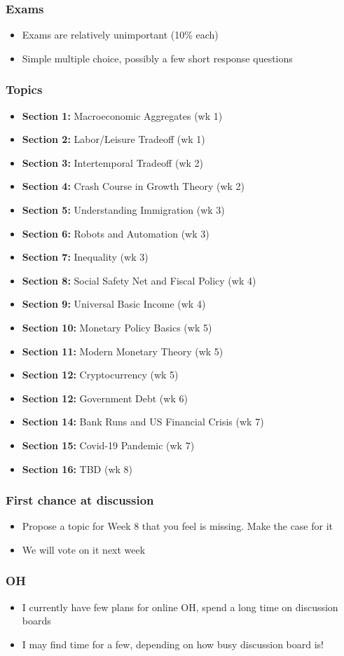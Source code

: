 \documentclass{beamer}
\begin{document}
\begin{frame}
\frametitle{Exams}
\begin{itemize}
\item Exams are relatively unimportant (10\% each)
\bigskip
\item Simple multiple choice, possibly a few short response questions
\end{itemize}
\end{frame}

\begin{frame}
\frametitle{Topics}
\begin{itemize}
\item \textbf{Section 1:} Macroeconomic Aggregates (wk 1)
\item \textbf{Section 2:} Labor/Leisure Tradeoff (wk 1)
\item \textbf{Section 3:} Intertemporal Tradeoff (wk 2)
\item \textbf{Section 4:} Crash Course in Growth Theory (wk 2)
\item \textbf{Section 5:} Understanding Immigration (wk 3)
\item \textbf{Section 6:} Robots and Automation (wk 3)
\item \textbf{Section 7:} Inequality (wk 3)
\item \textbf{Section 8:} Social Safety Net and Fiscal Policy (wk 4)
\item \textbf{Section 9:} Universal Basic Income (wk 4)
\item \textbf{Section 10:} Monetary Policy Basics (wk 5)
\item \textbf{Section 11:} Modern Monetary Theory (wk 5)
\item \textbf{Section 12:} Cryptocurrency (wk 5)
\item \textbf{Section 12:} Government Debt (wk 6)
\item \textbf{Section 14:} Bank Runs and US Financial Crisis (wk 7)
\item \textbf{Section 15:} Covid-19 Pandemic (wk 7)
\item \textbf{Section 16:} TBD (wk 8)
\end{itemize}
\end{frame}

\begin{frame}
\frametitle{First chance at discussion}
\begin{itemize}
\item Propose a topic for Week 8 that you feel is missing.  Make the case for it
\bigskip
\item We will vote on it next week
\end{itemize}
\end{frame}

\begin{frame}
\frametitle{OH}
\begin{itemize}
\item I currently have few plans for online OH, spend a long time on discussion boards
\bigskip
\item I may find time for a few, depending on how busy discussion board is!
\end{itemize}
\end{frame}
\end{document}
